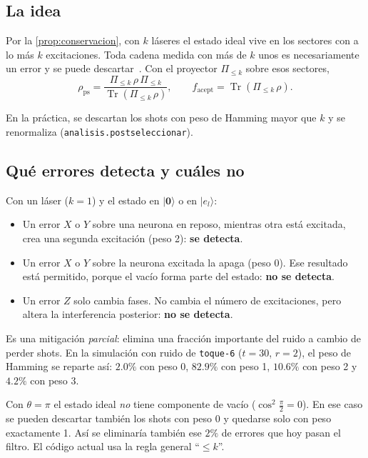 \documentclass[11pt,a4paper]{article}
\renewcommand{\ket}[1]{\lvert #1\rangle}
\newcommand{\vac}{\ket{\mathbf{0}}}
\newcommand{\tr}{\operatorname{Tr}}
\newcommand{\code}[1]{\texttt{#1}}
\theoremstyle{plain}
\theoremstyle{definition}
\theoremstyle{remark}
\begin{document}
\subsection{La idea}

Por la \cref{prop:conservacion}, con $k$ láseres el estado ideal vive en los sectores con a lo más $k$ excitaciones. Toda cadena medida con más de $k$ unos es necesariamente un error y se puede descartar~\cite{bonet2018,mcardle2019}. Con el proyector $\Pi_{\le k}$ sobre esos sectores,
\begin{equation}
\rho_{\text{ps}}=\frac{\Pi_{\le k}\,\rho\,\Pi_{\le k}}{\tr(\Pi_{\le k}\,\rho)},
\qquad
f_{\text{acept}}=\tr(\Pi_{\le k}\,\rho).
\end{equation}

En la práctica, se descartan los shots con peso de Hamming mayor que $k$ y se renormaliza (\code{analisis.postseleccionar}).

\subsection{Qué errores detecta y cuáles no}

Con un láser ($k=1$) y el estado en $\vac$ o en $\ket{e_l}$:

\begin{itemize}
\item Un error $X$ o $Y$ sobre una neurona en reposo, mientras otra está excitada, crea una segunda excitación (peso 2): \textbf{se detecta}.
\item Un error $X$ o $Y$ sobre la neurona excitada la apaga (peso 0). Ese resultado está permitido, porque el vacío forma parte del estado: \textbf{no se detecta}.
\item Un error $Z$ solo cambia fases. No cambia el número de excitaciones, pero altera la interferencia posterior: \textbf{no se detecta}.
\end{itemize}

Es una mitigación \emph{parcial}: elimina una fracción importante del ruido a cambio de perder shots. En la simulación con ruido de \code{toque-6} ($t=30$, $r=2$), el peso de Hamming se reparte así: $2.0\%$ con peso 0, $82.9\%$ con peso 1, $10.6\%$ con peso 2 y $4.2\%$ con peso 3.

\begin{idea}
Con $\theta=\pi$ el estado ideal \emph{no} tiene componente de vacío ($\cos^2\frac\pi2=0$). En ese caso se pueden descartar también los shots con peso 0 y quedarse solo con peso exactamente 1. Así se eliminaría también ese $2\%$ de errores que hoy pasan el filtro. El código actual usa la regla general ``$\le k$''.
\end{idea}
\end{document}
